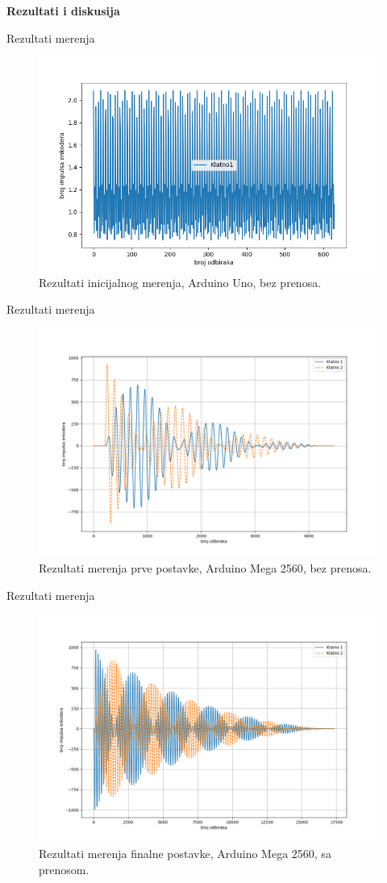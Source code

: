 \documentclass[aspectratio=169,xcolor=dvipsnames]{beamer}
\begin{document}
\begin{frame}
    \Huge{\centerline{\textbf{Rezultati i diskusija}}}
\end{frame}


\begin{frame}{Rezultati merenja}
    \begin{figure}
    \includegraphics[width=0.65\linewidth]{master_fig/klatno_0.png}
    \caption{Rezultati inicijalnog merenja, Arduino Uno, bez prenosa.}
    \end{figure}
\end{frame}

\begin{frame}{Rezultati merenja}
    \begin{figure}
    \includegraphics[width=0.65\linewidth]{master_fig/klatno.png}
    \caption{Rezultati merenja prve postavke, Arduino Mega 2560, bez prenosa.}
    \end{figure}
\end{frame}


\begin{frame}{Rezultati merenja}
    \begin{figure}
    \includegraphics[width=0.65\linewidth]{master_fig/klatno_2.png}
    \caption{Rezultati merenja finalne postavke, Arduino Mega 2560, sa prenosom.}
    \end{figure}
\end{frame}
\end{document}
